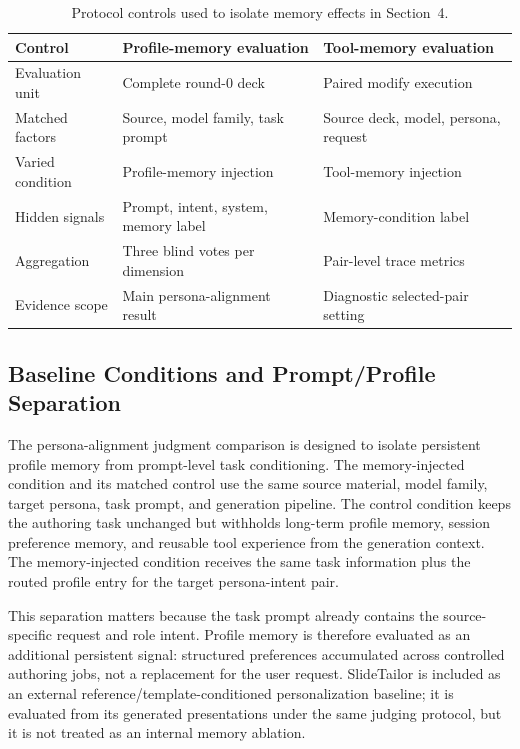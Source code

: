 \begin{table}[!htbp]
\centering
\small
\setlength{\tabcolsep}{5pt}
\caption{Protocol controls used to isolate memory effects in Section~4.}
\label{tab:appendix_eval_protocol_summary}
\begin{tabular}{lll}
\toprule
Control & Profile-memory evaluation & Tool-memory evaluation \\
\midrule
Evaluation unit & Complete round-0 deck & Paired modify execution \\
Matched factors & Source, model family, task prompt & Source deck, model, persona, request \\
Varied condition & Profile-memory injection & Tool-memory injection \\
Hidden signals & Prompt, intent, system, memory label & Memory-condition label \\
Aggregation & Three blind votes per dimension & Pair-level trace metrics \\
Evidence scope & Main persona-alignment result & Diagnostic selected-pair setting \\
\bottomrule
\end{tabular}
    \end{table}

\subsection{Baseline Conditions and Prompt/Profile Separation}
\label{app:baseline_provenance}

The persona-alignment judgment comparison is designed to isolate persistent profile
memory from prompt-level task conditioning. The memory-injected condition and
its matched control use the same source material, model family, target persona,
task prompt, and generation pipeline. The control condition keeps the authoring
task unchanged but withholds long-term profile memory, session preference
memory, and reusable tool experience from the generation context. The
memory-injected condition receives the same task information plus the routed
profile entry for the target persona-intent pair.

This separation matters because the task prompt already contains the
source-specific request and role intent. Profile memory is therefore evaluated
as an additional persistent signal: structured preferences accumulated across
controlled authoring jobs, not a replacement for the user request. SlideTailor is
included as an external reference/template-conditioned personalization baseline;
it is evaluated from its generated presentations under the same judging
protocol, but it is not treated as an internal memory ablation.

